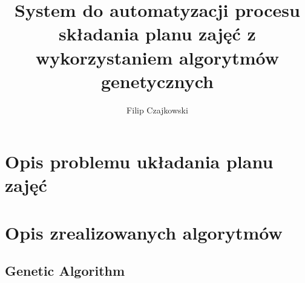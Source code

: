 \documentclass[11pt]{report}
\title{System do automatyzacji procesu składania planu zajęć z wykorzystaniem algorytmów genetycznych}
\begin{document}
%
%

\maketitle
\tableofcontents


\chapter{Opis problemu układania planu zajęć}





\chapter{Opis zrealizowanych algorytmów}




\section{Genetic Algorithm}
\author{Filip Czajkowski}
\end{document}
